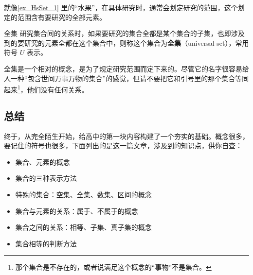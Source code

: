 就像\autoref{ex_HsSet_1} 里的“水果”，在具体研究时，通常会划定研究的范围，这个划定的范围含有要研究的全部元素。

\begin{definition}{全集}\label{def_HsSet_1}
研究集合间的关系时，如果要研究的集合全都是某个集合的子集，也即涉及到的要研究的元素全都在这个集合中，则称这个集合为\textbf{全集}（universal set），常用符号 $U$ 表示。
\end{definition}


全集是一个相对的概念，是为了规定研究范围而定下来的。尽管它的名字很容易给人一种“包含世间万事万物的集合”的感觉，但请不要把它和引号里的那个集合等同起来\footnote{那个集合是不存在的，或者说满足这个概念的“事物”不是集合。}，他们没有任何关系。


\subsection{总结}

终于，从完全陌生开始，给高中的第一块内容构建了一个夯实的基础。概念很多，要记住的符号也很多，下面列出的是这一篇文章，涉及到的知识点，供你自查：

\begin{itemize}
\item 集合、元素的概念
\item 集合的三种表示方法
\item 特殊的集合：空集、全集、数集、区间的概念
\item 集合与元素的关系：属于、不属于的概念
\item 集合之间的关系：相等、子集、真子集的概念
\item 集合相等的判断方法
\end{itemize}
